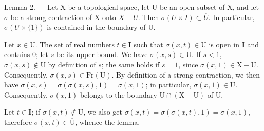 Lemma 2. --- Let X be a topological space, let U be an open subset of X, and let \(\sigma\) be a strong contraction of X onto \(X-U\). Then \(\sigma(U\times I)\subset\overline{U}\). In particular, \(\sigma(U\times\{1\})\) is contained in the boundary of U.

Let \(x \in \mathrm{U}\). The set of real numbers \(t \in \mathbf{I}\) such that \(\sigma(x, t) \in \mathrm{U}\) is open in \(\mathbf{I}\) and contains 0; let \(s\) be its upper bound. We have \(\sigma(x, s) \in \overline{\mathrm{U}}\). If \(s < 1\), \(\sigma(x, s) \notin \mathrm{U}\) by definition of \(s\); the same holds if \(s = 1\), since \(\sigma(x, 1) \in \mathrm{X} - \mathrm{U}\). Consequently, \(\sigma(x, s) \in \mathrm{Fr}(\mathrm{U})\). By definition of a strong contraction, we then have \(\sigma(x, s) = \sigma(\sigma(x, s), 1) = \sigma(x, 1)\); in particular, \(\sigma(x, 1) \in \overline{\mathrm{U}}\). Consequently, \(\sigma(x, 1)\) belongs to the boundary \(\overline{\mathrm{U}} \cap (\mathrm{X} - \mathrm{U})\) of \(\mathrm{U}\).

Let \(t \in \mathbf{I}\); if \(\sigma(x,t) \notin \mathrm{U}\), we also get \(\sigma(x,t) = \sigma(\sigma(x,t),1) = \sigma(x,1)\), therefore \(\sigma(x,t) \in \overline{\mathrm{U}}\), whence the lemma.


